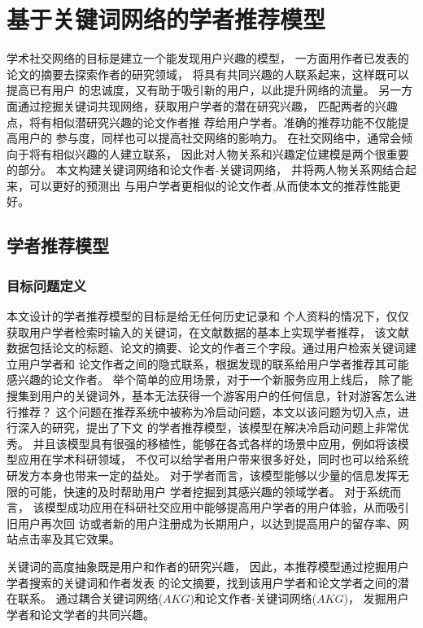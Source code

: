 ﻿\chapter{基于关键词网络的学者推荐模型}
学术社交网络的目标是建立一个能发现用户兴趣的模型，%
一方面用作者已发表的论文的摘要去探索作者的研究领域，%
将具有共同兴趣的人联系起来，这样既可以提高已有用户%
的忠诚度，又有助于吸引新的用户，以此提升网络的流量。%
另一方面通过挖掘关键词共现网络，获取用户学者的潜在研究兴趣，%
匹配两者的兴趣点，将有相似潜研究兴趣的论文作者推%
荐给用户学者。准确的推荐功能不仅能提高用户的%
参与度，同样也可以提高社交网络的影响力。%
在社交网络中，通常会倾向于将有相似兴趣的人建立联系，%
因此对人物关系和兴趣定位建模是两个很重要的部分。%
本文构建关键词网络和论文作者-关键词网络，%
并将两人物关系网结合起来，可以更好的预测出%
与用户学者更相似的论文作者,从而使本文的推荐性能更好。%

\section{学者推荐模型}
\subsection{目标问题定义}

本文设计的学者推荐模型的目标是给无任何历史记录和%
个人资料的情况下，仅仅获取用户学者检索时输入的关键词，在文献数据的基本上实现学者推荐，%
该文献数据包括论文的标题、论文的摘要、论文的作者三个字段。通过用户检索关键词建立用户学者和%
论文作者之间的隐式联系，根据发现的联系给用户学者推荐其可能感兴趣的论文作者。%
举个简单的应用场景，对于一个新服务应用上线后，%
除了能搜集到用户的关键词外，基本无法获得一个游客用户的任何信息，针对游客怎么进行推荐？%
这个问题在推荐系统中被称为冷启动问题，本文以该问题为切入点，进行深入的研究，提出了下文%
的学者推荐模型，该模型在解决冷启动问题上非常优秀。%
并且该模型具有很强的移植性，能够在各式各样的场景中应用，例如将该模型应用在学术科研领域，%
不仅可以给学者用户带来很多好处，同时也可以给系统研发方本身也带来一定的益处。%
对于学者而言，该模型能够以少量的信息发挥无限的可能，快速的及时帮助用户%
学者挖掘到其感兴趣的领域学者。
对于系统而言，
该模型成功应用在科研社交应用中能够提高用户学者的用户体验，从而吸引旧用户再次回%
访或者新的用户注册成为长期用户，以达到提高用户的留存率、网站点击率及其它效果。

关键词的高度抽象既是用户和作者的研究兴趣，%
因此，本推荐模型通过挖掘用户学者搜索的关键词和作者发表%
的论文摘要，找到该用户学者和论文学者之间的潜在联系。%
通过耦合关键词网络($AKG$)和论文作者-关键词网络($AKG$)，%
发掘用户学者和论文学者的共同兴趣。%


